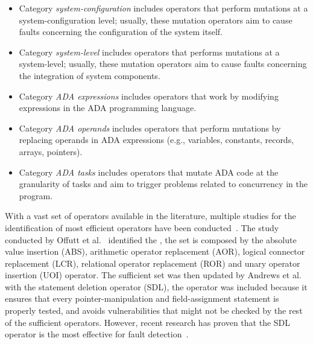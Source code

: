 \begin{itemize}
\item Category \emph{system-configuration} includes operators that perform mutations at a system-configuration level; usually, these mutation operators aim to cause faults concerning the configuration of the system itself.
\item Category \emph{system-level} includes operators that performs mutations at a system-level; usually, these mutation operators aim to cause faults concerning the integration of system components. 
\item Category \emph{ADA expressions} includes operators that work by modifying expressions in the ADA programming language. 
\item Category \emph{ADA operands} includes operators that perform mutations by replacing operands in ADA expressions (e.g., variables, constants, records, arrays, pointers).
\item Category \emph{ADA tasks} includes operators that mutate ADA code at the granularity of tasks and aim to trigger problems related to concurrency in the program.
\end{itemize}

With a vast set of operators available in the literature, multiple studies for the identification of most efficient operators have been conducted~\cite{rothermel1996experimental}. The study conducted by Offutt et al.~\cite{rothermel1996experimental} identified the , the set is composed by the absolute value insertion (ABS), arithmetic operator replacement (AOR), logical connector replacement (LCR), relational operator replacement (ROR) and unary operator insertion (UOI) operator. 
The sufficient set was then updated by Andrews et al.~\cite{andrews2005mutation} with the statement deletion operator (SDL), the operator was included because it ensures that every pointer-manipulation and field-assignment statement is properly tested, and avoids vulnerabilities that might not be checked by the rest of the sufficient operators. However, recent research has proven that the SDL operator is the most effective for fault detection~\cite{delamaro2014designing}. 

